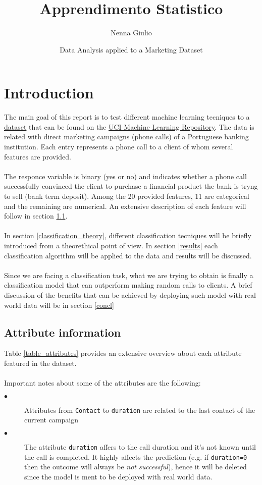 \documentclass{article}
\title{Apprendimento Statistico}
\author{Nenna Giulio}
\date{Data Analysis applied to a Marketing Dataset}
\numberwithin{equation}{section}
\theoremstyle{definition}
\theoremstyle{plain}
\theoremstyle{definition}
\theoremstyle{remark}
\begin{document}
\maketitle
\section{Introduction} 
The main goal of this report is to test different machine learning tecniques to a \href{http://archive.ics.uci.edu/ml/datasets/Bank+Marketing}{dataset} that can be found on the \href{http://archive.ics.uci.edu/ml/index.php}{UCI Machine Learning Repository}. The data is related with direct marketing campaigns (phone calls) of a Portuguese banking institution. Each entry represents a phone call to a client of whom several features are provided. \\
\\
The responce variable is binary (yes or no) and indicates whether a phone call successfully convinced the client to purchase a financial product the bank is tryng to sell (bank term deposit). Among the 20 provided features, 11 are categorical and the remaining are numerical. An extensive description of each feature will follow in section \ref{attr_info}.\\
\\
In section \ref{classification_theory}, different classification tecniques will be briefly introduced from a theorethical point of view. In section \ref{results} each classification algorithm will be applied to the data and results will be discussed.\\
\\
Since we are facing a classification task, what we are trying to obtain is finally a classification model that can outperform making random calls to clients. A brief discussion of the benefits that can be achieved by deploying such model with real world data will be in section \ref{concl}


\subsection{Attribute information}
\label{attr_info}
Table \ref{table_attributes} provides an extensive overview about each attribute featured in the dataset.
\\
\\
Important notes about some of the attributes are the following:
\begin{description}
  \item[$\bullet$] Attributes from \texttt{Contact} to \texttt{duration} are related to the last contact of the current campaign
  \item[$\bullet$ ] The attribute \texttt{duration} affers to the call duration and it's not known until the call is completed. It highly affects the prediction (e.g. if \texttt{duration=0} then the outcome will always be \textit{not successful}), hence it will be deleted since the model is ment to be deployed with real world data.  
\end{description}
\end{document}
